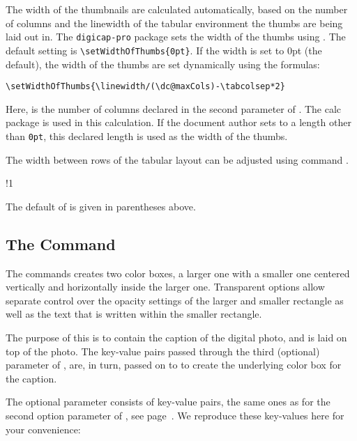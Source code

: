 \documentclass{article}
\begin{document}
The width of the thumbnails are calculated automatically, based on the number
of columns and the linewidth of the tabular environment the thumbs are being
laid out in. The \texttt{digicap-pro} package sets the width of the thumbs using
. The default setting is \verb!\setWidthOfThumbs{0pt}!.
If the width is set to 0pt (the default), the width of the thumbs are
set dynamically using the formulas:
\begin{Verbatim}[xleftmargin=\parindent]
\setWidthOfThumbs{\linewidth/(\dc@maxCols)-\tabcolsep*2}
\end{Verbatim}
Here,  is the number of columns declared in the second
parameter of . The \textsf{calc} package is used in this
calculation. If the document author sets  to a length
other than \texttt{0pt}, this declared length is used as the width of the
thumbs.

The width between rows of the tabular layout can be adjusted using
command .
\bVerb{}%
\def\1{\rlap{\hskip\bxSize\enspace{\normalfont{(\texttt{1ex})}}}}
\begin{dCmd*}[commandchars=!()]{\bxSize}
!1
\end{dCmd*}
\eVerb
The default of  is given in parentheses above.

\subsection{The \texorpdfstring{\protect{}}{} Command}

The  commands creates two color boxes, a larger one with a smaller one
centered vertically and horizontally inside the larger one.
Transparent options allow separate control over the opacity settings
of the larger and smaller rectangle as well as the text that is
written within the smaller rectangle.

The purpose of this  is to contain the caption of the
digital photo, and is laid on top of the photo. The key-value pairs passed through the
third (optional) parameter of , are, in turn, passed on to 
to create the underlying color box for the caption.

\bVerb{}%
\begin{dCmd*}[commandchars=!()]{\bxSize}
\end{dCmd*}
\eVerb
The optional parameter consists of key-value pairs, the same ones as for the second
option parameter of , see page~\pageref{ss:digiCap}. We reproduce these
key-values here for your convenience:
\end{document}
